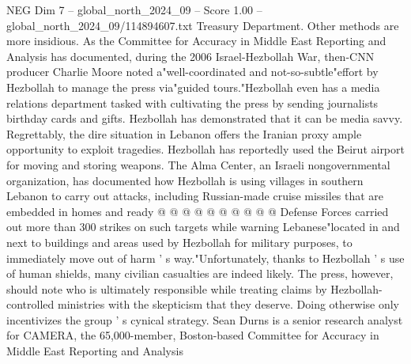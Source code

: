 \begin{textsample}{NEG Dim 7 – global\_north\_2024\_09 – Score 1.00 – global\_north\_2024\_09/114894607.txt}
Treasury Department.
Other methods are more insidious.
As the Committee for Accuracy in Middle East Reporting and Analysis has documented, during the 2006 Israel-Hezbollah War, then-CNN producer Charlie Moore noted a"well-coordinated and not-so-subtle"effort by Hezbollah to manage the press via"guided tours."Hezbollah even has a media relations department tasked with cultivating the press by sending journalists birthday cards and gifts.
Hezbollah has demonstrated that it can be media savvy.
Regrettably, the dire situation in Lebanon offers the Iranian proxy ample opportunity to exploit tragedies.
Hezbollah has reportedly used the Beirut airport for moving and storing weapons.
The Alma Center, an Israeli nongovernmental organization, has documented how Hezbollah is using villages in southern Lebanon to carry out attacks, including Russian-made cruise missiles that are embedded in homes and ready @ @ @ @ @ @ @ @ @ @ Defense Forces carried out more than 300 strikes on such targets while warning Lebanese"located in and next to buildings and areas used by Hezbollah for military purposes, to immediately move out of harm ' s way."Unfortunately, thanks to Hezbollah ' s use of human shields, many civilian casualties are indeed likely.
The press, however, should note who is ultimately responsible while treating claims by Hezbollah-controlled ministries with the skepticism that they deserve.
Doing otherwise only incentivizes the group ' s cynical strategy.
Sean Durns is a senior research analyst for CAMERA, the 65,000-member, Boston-based Committee for Accuracy in Middle East Reporting and Analysis

\end{textsample}
